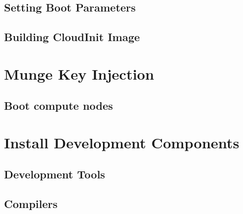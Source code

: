 \documentclass{ohpc-doc}
\begin{document}
\section{Setting Boot Parameters}\label{sec:boot_params_set}


\section{Building CloudInit Image}\label{sec:cloudinit}



%
%


\chapter{Munge Key Injection} \label{sec:cloudinit-munge}


\section{Boot compute nodes} \label{sec:boot_computes}


\chapter{Install \OHPC{} Development Components}


\section{Development Tools} \label{sec:install_dev_tools}


\section{Compilers} \label{sec:install_compilers}

\end{document}
